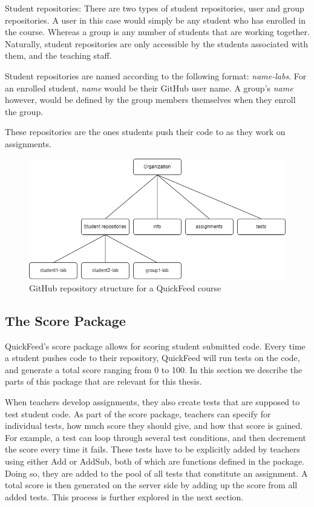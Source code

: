 Student repositories: There are two types of student repositories, user and group repositories.
A user in this case would simply be any student who has enrolled in the course.
Whereas a group is any number of students that are working together.
Naturally, student repositories are only accessible by the students associated with them, and the teaching staff.

Student repositories are named according to the following format: \textit{name-labs}.
For an enrolled student, \textit{name} would be their GitHub user name.
A group's \textit{name} however, would be defined by the group members themselves when they enroll the group.

These repositories are the ones students push their code to as they work on assignments.

\begin{figure}[ht]
    \centering
    \includegraphics[width=\textwidth]{photos/qf-repository-structure.png}
    \caption{GitHub repository structure for a QuickFeed course}
    \label{fig:qf-repository-structure}
\end{figure}

\subsection{The Score Package}

QuickFeed's score package allows for scoring student submitted code.
Every time a student pushes code to their repository, QuickFeed will run tests on the code, and generate a total score ranging from 0 to 100.
In this section we describe the parts of this package that are relevant for this thesis.

When teachers develop assignments, they also create tests that are supposed to test student code.
As part of the score package, teachers can specify for individual tests, how much score they should give, and how that score is gained.
For example, a test can loop through several test conditions, and then decrement the score every time it fails.
These tests have to be explicitly added by teachers using either Add or AddSub, both of which are functions defined in the package.
Doing so, they are added to the pool of all tests that constitute an assignment.
A total score is then generated on the server side by adding up the score from all added tests.
This process is further explored in the next section.

